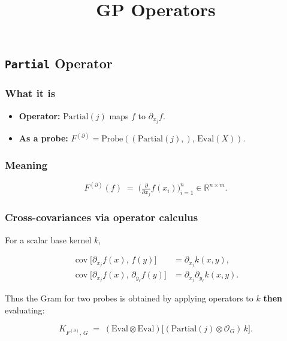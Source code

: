 \documentclass[
  letterpaper,
  DIV=11,
  numbers=noendperiod]{scrartcl}
\title{GP Operators}
\author{}
\date{}
\providecommand{\tightlist}{%
  \setlength{\itemsep}{0pt}\setlength{\parskip}{0pt}}
\begin{document}
\maketitle


\subsection{\texorpdfstring{\texttt{Partial}
Operator}{Partial Operator}}\label{partial-operator}

\subsubsection{What it is}\label{what-it-is}

\begin{itemize}
\tightlist
\item
  \textbf{Operator:} \(\mathrm{Partial}(j)\) maps \(f\) to
  \(\partial_{x_j} f\).
\item
  \textbf{As a probe:}
  \(F^{(\partial)} = \text{Probe}((\mathrm{Partial}(j),),\, \mathrm{Eval}(X))\).
\end{itemize}

\subsubsection{Meaning}\label{meaning}

\[
F^{(\partial)}(f) \;=\; \Big(\tfrac{\partial}{\partial x_j} f(x_i)\Big)_{i=1}^n \in \mathbb{R}^{n\times m}.
\]

\subsubsection{Cross-covariances via operator
calculus}\label{cross-covariances-via-operator-calculus}

For a scalar base kernel \(k\),

\[
\begin{aligned}
\operatorname{cov}\!\big[\partial_{x_j} f(x),\, f(y)\big] &= \partial_{x_j} k(x,y),\\
\operatorname{cov}\!\big[\partial_{x_j} f(x),\, \partial_{y_\ell} f(y)\big] &= \partial_{x_j}\partial_{y_\ell} k(x,y).
\end{aligned}
\]

Thus the Gram for two probes is obtained by applying operators to \(k\)
\textbf{then} evaluating:

\[
K_{F^{(\partial)},\,G} \;=\; (\mathrm{Eval}\otimes \mathrm{Eval})\big[(\mathrm{Partial}(j)\otimes \mathcal{O}_G)\,k\big].
\]
\end{document}
